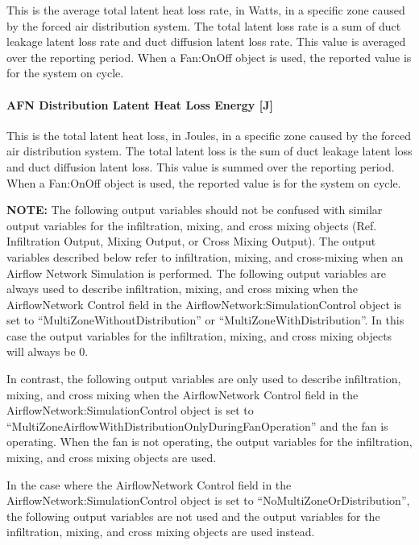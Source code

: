 This is the average total latent heat loss rate, in Watts, in a specific zone caused by the forced air distribution system. The total latent loss rate is a sum of duct leakage latent loss rate and duct diffusion latent loss rate. This value is averaged over the reporting period. When a Fan:OnOff object is used, the reported value is for the system on cycle.

\paragraph{AFN Distribution Latent Heat Loss Energy {[}J{]}}\label{afn-distribution-latent-heat-loss-energy-j}

This is the total latent heat loss, in Joules, in a specific zone caused by the forced air distribution system. The total latent loss is the sum of duct leakage latent loss and duct diffusion latent loss. This value is summed over the reporting period. When a Fan:OnOff object is used, the reported value is for the system on cycle.

\textbf{NOTE:} The following output variables should not be confused with similar output variables for the infiltration, mixing, and cross mixing objects (Ref. Infiltration Output, Mixing Output, or Cross Mixing Output). The output variables described below refer to infiltration, mixing, and cross-mixing when an Airflow Network Simulation is performed. The following output variables are always used to describe infiltration, mixing, and cross mixing when the AirflowNetwork Control field in the AirflowNetwork:SimulationControl object is set to ``MultiZoneWithoutDistribution'' or ``MultiZoneWithDistribution''. In this case the output variables for the infiltration, mixing, and cross mixing objects will always be 0.

In contrast, the following output variables are only used to describe infiltration, mixing, and cross mixing when the AirflowNetwork Control field in the AirflowNetwork:SimulationControl object is set to ``MultiZoneAirflowWithDistributionOnlyDuringFanOperation'' and the fan is operating. When the fan is not operating, the output variables for the infiltration, mixing, and cross mixing objects are used.

In the case where the AirflowNetwork Control field in the AirflowNetwork:SimulationControl object is set to ``NoMultiZoneOrDistribution'', the following output variables are not used and the output variables for the infiltration, mixing, and cross mixing objects are used instead.

